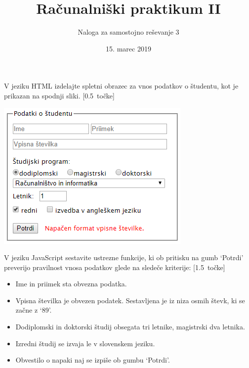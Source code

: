 \documentclass[a4paper,12pt]{article}
\title{Računalniški praktikum II}
\author{Naloga za samostojno reševanje 3}
\date{15. marec 2019}
\begin{document}
\maketitle
\thispagestyle{empty}

\noindent
V jeziku HTML izdelajte spletni obrazec za vnos podatkov o študentu, kot je prikazan na spodnji sliki. [0.5~točke]
\begin{center}
\includegraphics{obrazec.png}
\end{center}

\noindent
V jeziku JavaScript sestavite ustrezne funkcije, ki ob pritisku na gumb `Potrdi' preverijo pravilnost vnosa podatkov glede na sledeče kriterije: [1.5~točke]
\begin{itemize}
\item Ime in priimek sta obvezna podatka.
\item Vpisna številka je obvezen podatek. Sestavljena je iz niza osmih števk, ki se začne z `89'.
\item Dodiplomski in doktorski študij obsegata tri letnike, magistrski dva letnika.
\item Izredni študij se izvaja le v slovenskem jeziku.
\item Obvestilo o napaki naj se izpiše ob gumbu `Potrdi'.
\end{itemize}
\end{document}
